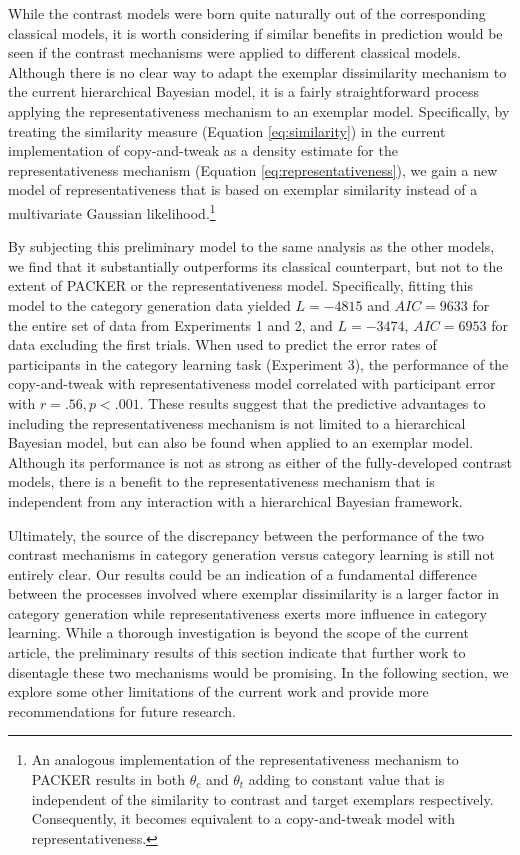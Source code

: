 \documentclass[12pt]{article}
\begin{document}
\begin{flushleft}
{While the contrast models were born quite naturally out of the corresponding
classical models, it is worth considering if similar benefits in prediction
would be seen if the contrast mechanisms were applied to different classical
models. Although there is no clear way to adapt the exemplar dissimilarity
mechanism to the current hierarchical Bayesian model, it is a fairly
straightforward process applying the representativeness mechanism to an exemplar
model. Specifically, by treating the similarity measure (Equation
\ref{eq:similarity}) in the current implementation of copy-and-tweak as a
density estimate for the representativeness mechanism (Equation
\ref{eq:representativeness}), we gain a new model of representativeness that is
based on exemplar similarity instead of a multivariate Gaussian
likelihood.\footnote{An analogous implementation of the representativeness
  mechanism to PACKER results in both $\theta_c$ and $\theta_t$ adding to
  constant value that is independent of the similarity to contrast and target
  exemplars respectively. Consequently, it becomes equivalent to a
  copy-and-tweak model with representativeness.}

By subjecting this preliminary model to the same analysis as the other models,
we find that it substantially outperforms its classical counterpart, but not to
the extent of PACKER or the representativeness model. Specifically, fitting this
model to the category generation data yielded $L = -4815$ and $AIC=9633$ for the
entire set of data from Experiments 1 and 2, and $L = -3474$, $AIC=6953$ for
data excluding the first trials. When used to predict the error rates of
participants in the category learning task (Experiment 3), the performance of
the copy-and-tweak with representativeness model correlated with participant
error with $r=.56, p<.001$. These results suggest that the predictive advantages
to including the representativeness mechanism is not limited to a hierarchical
Bayesian model, but can also be found when applied to an exemplar model.
Although its performance is not as strong as either of the fully-developed
contrast models, there is a benefit to the representativeness mechanism that is
independent from any interaction with a hierarchical Bayesian framework.

Ultimately, the source of the discrepancy between the performance of the two
contrast mechanisms in category generation versus category learning is still not
entirely clear. Our results could be an indication of a fundamental difference
between the processes involved where exemplar dissimilarity is a larger factor
in category generation while representativeness exerts more influence in
category learning. While a thorough investigation is beyond the scope of the
current article, the preliminary results of this section indicate that further
work to disentagle these two mechanisms would be promising. In the following
section, we explore some other limitations of the current work and provide more
recommendations for future research.

}
\end{flushleft}
\end{document}
